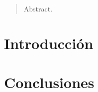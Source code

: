 \documentclass[10pt, a4paper,spanish]{article}
\begin{document}
	\maketitle %

	\thispagestyle{fancy} %



	\begin{abstract}
		\noindent Abstract.
	\end{abstract}



	\section{Introducción}

		\paragraph{}

	\section{Conclusiones}

		\paragraph{}
	\nocite{subject:cp}
  
  
\end{document}
